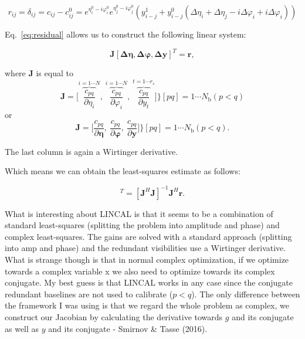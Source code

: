 \documentclass[a4paper,fleqn,usenatbib]{mnras}
\begin{document}
\begin{equation}
\label{eq:residual}
r_{ij} = \delta_{ij} = c_{ij}-c_{ij}^0 = e^{\eta_i^0 - i \varphi_i^0} e^{\eta_j^0 - i \varphi_j^0}(y_{i-j}^1 + y_{i-j}^0( \Delta \eta_i+ \Delta \eta_j - i\Delta\varphi_i + i\Delta\varphi_i)) 
\end{equation}

Eq.~\ref{eq:residual} allows us to construct the following linear system:

\begin{equation}
\boldsymbol{J}[\boldsymbol{\Delta \eta},\boldsymbol{\Delta \varphi},\boldsymbol{\Delta y}]^T = \boldsymbol{r}, 
\end{equation}

where $\boldsymbol{J}$ is equal to 
\begin{equation}
\boldsymbol{J} = \bigg [\overbrace{\frac{c_{pq}}{\partial \eta_i}}^{i= 1\cdots N},~\overbrace{\frac{c_{pq}}{\partial \varphi_i}}^{i= 1\cdots N},~\overbrace{\frac{c_{pq}}{\partial y_{t}}}^{t=1\cdots r_s} \bigg ] \bigg \} [pq] = 1\cdots N_{\textrm{b}} (p<q) 
\end{equation}
or
\begin{equation}
\boldsymbol{J} = \bigg [\frac{c_{pq}}{\partial \boldsymbol{\eta}},~\frac{c_{pq}}{\partial \boldsymbol{\varphi}},~\frac{c_{pq}}{\partial \boldsymbol{y}} \bigg ] \bigg \} [pq] = 1\cdots N_{\textrm{b}} (p<q). 
\end{equation}

The last column is again a Wirtinger derivative.

Which means we can obtain the least-squares estimate as follows:

\begin{equation}
[\boldsymbol{\Delta \eta},\boldsymbol{\Delta \varphi},\boldsymbol{\Delta y}]^T = [\boldsymbol{J}^H\boldsymbol{J}]^{-1}\boldsymbol{J}^H\boldsymbol{r}.
\end{equation}

What is interesting about LINCAL is that it seems to be a combination of standard least-squares (splitting the problem into amplitude and phase) and 
complex least-squares. The gains are solved with a standard approach (splitting into amp and phase) and the redundant visibilities use a Wirtinger derivative. What is strange though is that in normal complex optimization, if we optimize towards a complex variable x we also need to optimize towards
its complex conjugate. My best guess is that LINCAL works in any case since the conjugate redundant baselines are not used to calibrate ($p<q$). The only difference between the framework I was using is that
we regard the whole problem as complex, we construct our Jacobian by calculating the derivative towards $g$ and its conjugate as well as $y$ and its conjugate - Smirnov \& Tasse (2016). 
\end{document}
